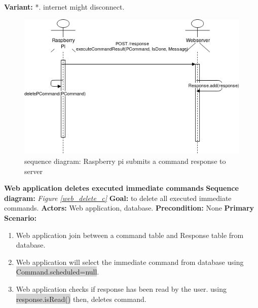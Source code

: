 \documentclass[12pt, oneside, a4paper]{book}
\newcommand{\code}[1]{{\color{red}\colorbox{lightgray}{#1}}}
\newcommand\boldcolor[1]{\textcolor{bold}{\textbf{#1}}}
\begin{document}
				\textbf{Variant:}\newline	
				\hspace*{5mm}*. internet might disconnect.\\
				\begin{figure}[H]
					\includegraphics[width=\linewidth]{img/sequence_submit_response.png}
					\caption{sequence diagram: Raspberry pi submits a command response to server}
					\label{rp_response}
				\end{figure}
				\newpage\hspace*{-6mm}\boldcolor{Web application deletes executed immediate commands}
				\newline\textbf{Sequence diagram:} \textit{Figure \ref{web_delete_c}}
				\newline\textbf{Goal:} to delete all executed immediate commands.
				\newline\textbf{Actors:} Web application, database.
				\newline\textbf{Precondition:} None
				\newline\textbf{Primary Scenario:}	
				\begin{enumerate}[label*=\arabic*.]
					\item Web application join between a command table and Response table from database.  
					\item  Web application will select the immediate command from database using \code{Command.scheduled=null}.
					\item Web application checks if response has been read by the user. using \code{response.isRead()} then, deletes command.
				\end{enumerate}
\end{document}
